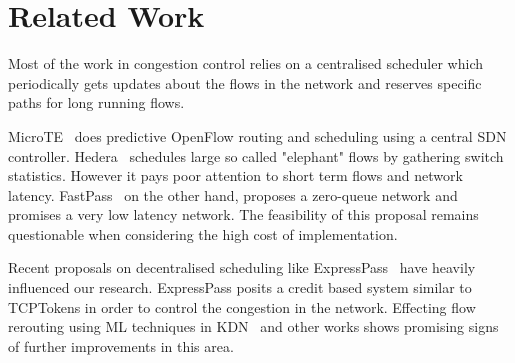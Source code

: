 \section{Related Work}
\label{sec:related}

Most of the work in congestion control relies on a centralised scheduler which periodically gets updates about the flows in the network and reserves specific paths for long running flows.

MicroTE~\cite{microte} does predictive OpenFlow routing and scheduling using a central SDN controller. Hedera~\cite{hedera} schedules large so called "elephant" flows by gathering switch statistics. However it pays poor attention to short term flows and network latency. FastPass~\cite{fastpass} on the other hand, proposes a zero-queue network and promises a very low latency network. The feasibility of this proposal remains questionable when considering the high cost of implementation.

Recent proposals on decentralised scheduling like ExpressPass~\cite{expresspass} have heavily influenced our research. ExpressPass posits a credit based system similar to TCPTokens in order to control the congestion in the network. Effecting flow rerouting using ML techniques in KDN~\cite{kdn} and other works shows promising signs of further improvements in this area.

